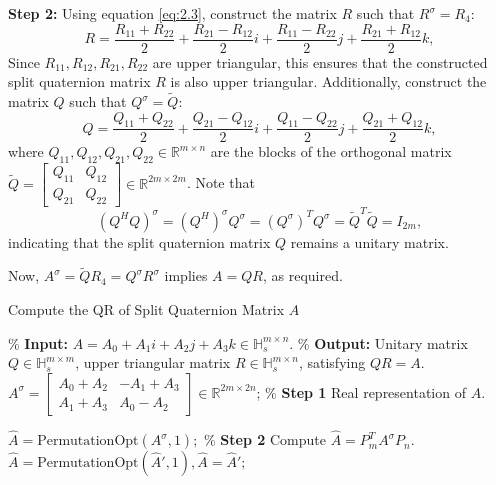 \documentclass{book}
\makeatletter
\def\my@tag@font{\normalsize}
\let\amsmath@eqref\eqref
\renewcommand\eqref[1]{{\let\my@tag@font\relax\amsmath@eqref{#1}}}
\theoremstyle{remark}
\makeatother
\begin{document}
\begin{multicols}{2}
\textbf{Step 2:} Using equation \eqref{eq:2.3}, construct the matrix $R$ such that $R^\sigma=R_4:$
\begin{equation*}
R = \frac{R_{11} + R_{22}}{2} + \frac{R_{21} - R_{12}}{2}i + \frac{R_{11} - R_{22}}{2}j + \frac{R_{21} + R_{12}}{2}k,
\end{equation*}
Since $R_{11}, R_{12}, R_{21}, R_{22}$ are upper triangular, this ensures that the constructed split quaternion matrix $R$ is also upper triangular. Additionally, construct the matrix $Q$ such that $Q^\sigma=\widetilde{Q}:$
\begin{equation*}
Q = \frac{Q_{11} + Q_{22}}{2} + \frac{Q_{21} - Q_{12}}{2}i + \frac{Q_{11} - Q_{22}}{2}j + \frac{Q_{21} + Q_{12}}{2}k,
\end{equation*}
where $Q_{11}, Q_{12}, Q_{21}, Q_{22} \in \mathbb{R}^{m \times n}$ are the blocks of the orthogonal matrix $\widetilde{Q} = \begin{bmatrix} Q_{11} & Q_{12} \\ Q_{21} & Q_{22} \end{bmatrix} \in \mathbb{R}^{2m \times 2m}$. Note that \[(Q^H Q)^\sigma = {(Q^H)}^\sigma Q^\sigma = {(Q^\sigma)}^TQ^\sigma = \widetilde{Q}^T\widetilde{Q} = I_{2m},\] indicating that the split quaternion matrix $Q$ remains a unitary matrix.

Now, $A^\sigma=\widetilde{Q}R_4=Q^\sigma R^\sigma$ implies
$A = Q R$, as required.
 
\begin{algorithm}[htbp] 
    \caption{Compute the QR of Split Quaternion Matrix \(A\)}
    \label{alg:QR}
    \begin{algorithmic}[1]
        \State \% \textbf{Input:} \(A = A_0 + A_1 i + A_2 j + A_3 k \in \mathbb{H}_s^{m\times n}\).
        \State \% \textbf{Output:} Unitary matrix \(Q \in \mathbb{H}_s^{m\times m}\), upper triangular matrix \(R \in \mathbb{H}_s^{m\times n}\), satisfying \(Q  R = A\).
        \State \(A^\sigma = \begin{bmatrix}
            A_0 + A_2 & -A_1 + A_3 \\ 
            A_1 + A_3 & A_0 - A_2
            \end{bmatrix} \in \mathbb{R}^{2m\times 2n}\); \qquad\qquad\qquad\qquad \% \textbf{Step 1} Real representation of $A$.
        
        \State $\widehat{A}=\text{PermutationOpt}(A^\sigma,1);$  \qquad\qquad\qquad\qquad\qquad\qquad\quad\% \textbf{Step 2} Compute \(\widehat{A} = P_{m}^T A^\sigma P_{n}\).
        \State $\widehat{A}=\text{PermutationOpt}(\widehat{A}',1),\widehat{A}=\widehat{A}';$
        

\end{algorithmic}
\end{algorithm}
\end{multicols}
\end{document}
